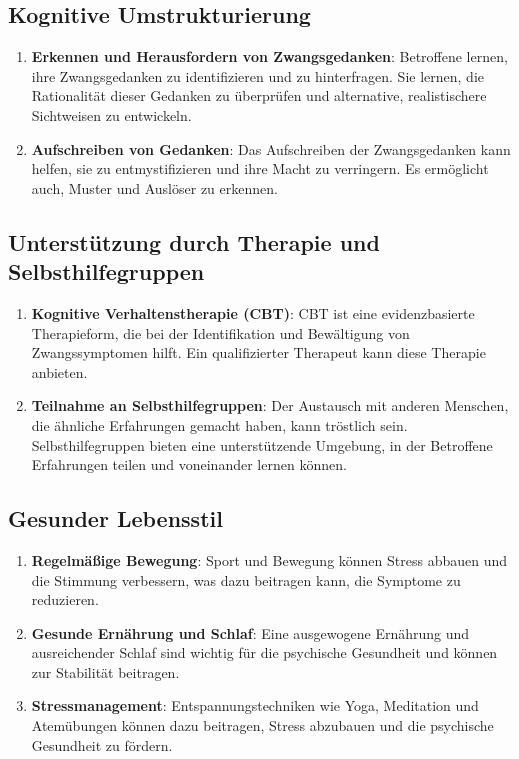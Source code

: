 \subsection{Kognitive Umstrukturierung}

\begin{enumerate}
  \item \textbf{Erkennen und Herausfordern von Zwangsgedanken}: Betroffene lernen, ihre Zwangsgedanken zu identifizieren und zu hinterfragen. Sie lernen, die Rationalität dieser Gedanken zu überprüfen und alternative, realistischere Sichtweisen zu entwickeln.
  
  \item \textbf{Aufschreiben von Gedanken}: Das Aufschreiben der Zwangsgedanken kann helfen, sie zu entmystifizieren und ihre Macht zu verringern. Es ermöglicht auch, Muster und Auslöser zu erkennen.
\end{enumerate}

\subsection{Unterstützung durch Therapie und Selbsthilfegruppen}

\begin{enumerate}
  \item \textbf{Kognitive Verhaltenstherapie (CBT)}: CBT ist eine evidenzbasierte Therapieform, die bei der Identifikation und Bewältigung von Zwangssymptomen hilft. Ein qualifizierter Therapeut kann diese Therapie anbieten.
  
  \item \textbf{Teilnahme an Selbsthilfegruppen}: Der Austausch mit anderen Menschen, die ähnliche Erfahrungen gemacht haben, kann tröstlich sein. Selbsthilfegruppen bieten eine unterstützende Umgebung, in der Betroffene Erfahrungen teilen und voneinander lernen können.
\end{enumerate}

\subsection{Gesunder Lebensstil}

\begin{enumerate}
  \item \textbf{Regelmäßige Bewegung}: Sport und Bewegung können Stress abbauen und die Stimmung verbessern, was dazu beitragen kann, die Symptome zu reduzieren.
  
  \item \textbf{Gesunde Ernährung und Schlaf}: Eine ausgewogene Ernährung und ausreichender Schlaf sind wichtig für die psychische Gesundheit und können zur Stabilität beitragen.
  
  \item \textbf{Stressmanagement}: Entspannungstechniken wie Yoga, Meditation und Atemübungen können dazu beitragen, Stress abzubauen und die psychische Gesundheit zu fördern.
\end{enumerate}

